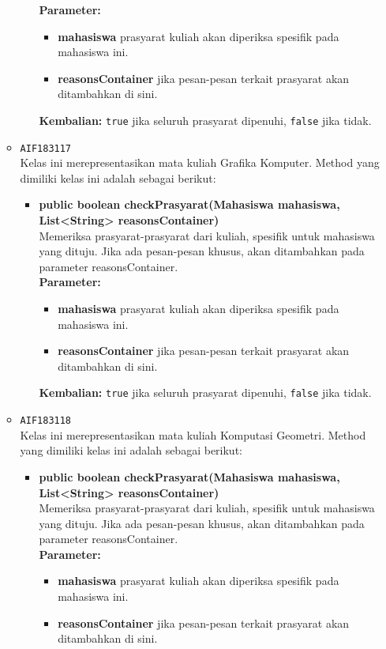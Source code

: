 \begin{enumerate}
\begin{itemize}
\begin{itemize}
\textbf{Parameter:}
\begin{itemize}
\item \textbf{mahasiswa} prasyarat kuliah akan diperiksa spesifik pada mahasiswa ini.
\item \textbf{reasonsContainer} jika pesan-pesan terkait prasyarat akan ditambahkan di sini.
\end{itemize}
\textbf{Kembalian:} \texttt{true} jika seluruh prasyarat dipenuhi, \texttt{false} jika tidak.
\end{itemize}
\item \texttt{AIF183117} \\
Kelas ini merepresentasikan mata kuliah Grafika Komputer. Method yang dimiliki kelas ini adalah sebagai berikut: 
\begin{itemize}
\item \textbf{public boolean checkPrasyarat(Mahasiswa mahasiswa, List<String> reasonsContainer)}\\
Memeriksa prasyarat-prasyarat dari kuliah, spesifik untuk mahasiswa yang dituju. Jika ada pesan-pesan khusus, akan ditambahkan pada parameter reasonsContainer.\\
\textbf{Parameter:}
\begin{itemize}
\item \textbf{mahasiswa} prasyarat kuliah akan diperiksa spesifik pada mahasiswa ini.
\item \textbf{reasonsContainer} jika pesan-pesan terkait prasyarat akan ditambahkan di sini.
\end{itemize}
\textbf{Kembalian:} \texttt{true} jika seluruh prasyarat dipenuhi, \texttt{false} jika tidak.
\end{itemize}
\item \texttt{AIF183118} \\
Kelas ini merepresentasikan mata kuliah Komputasi Geometri. Method yang dimiliki kelas ini adalah sebagai berikut: 
\begin{itemize}
\item \textbf{public boolean checkPrasyarat(Mahasiswa mahasiswa, List<String> reasonsContainer)}\\
Memeriksa prasyarat-prasyarat dari kuliah, spesifik untuk mahasiswa yang dituju. Jika ada pesan-pesan khusus, akan ditambahkan pada parameter reasonsContainer.\\
\textbf{Parameter:}
\begin{itemize}
\item \textbf{mahasiswa} prasyarat kuliah akan diperiksa spesifik pada mahasiswa ini.
\item \textbf{reasonsContainer} jika pesan-pesan terkait prasyarat akan ditambahkan di sini.

\end{itemize}
\end{itemize}
\end{itemize}
\end{enumerate}
